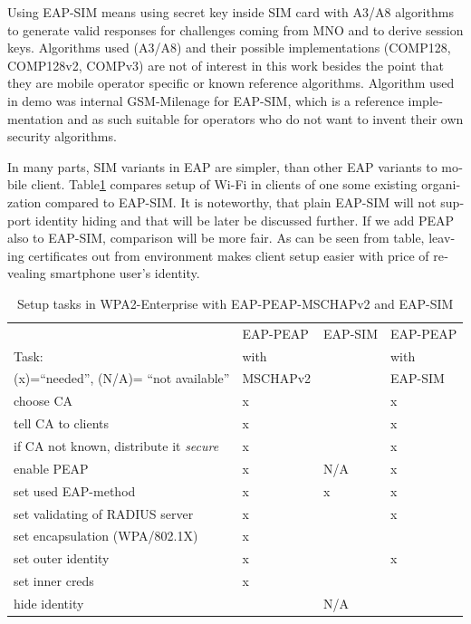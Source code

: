 \documentclass[12pt,a4paper,english]{tutthesis}
\begin{document}
\begin{otherlanguage}{english}
  Using EAP-SIM means using secret key inside SIM card with A3/A8
algorithms to generate valid responses for challenges coming from MNO
and to derive session keys.  Algorithms used (A3/A8) and their
possible implementations (COMP128, COMP128v2, COMPv3) are not of
interest in this work besides the point that they are mobile operator
specific or known reference algorithms.
Algorithm used in demo was internal GSM-Milenage for EAP-SIM,
which is a reference implementation and as such suitable for  operators who do not 
want to invent their own security algorithms. 


In many parts, SIM variants in EAP are simpler, than other EAP
variants to mobile client.  Table\ref{table-peapsim} compares setup of Wi-Fi
in clients of one some existing organization compared to EAP-SIM. It
is noteworthy, that plain EAP-SIM will not support identity hiding and
that will be later be discussed further. If we add PEAP \cite{peap}
also to EAP-SIM, comparison will be more fair.
As can be seen from table, leaving certificates out from environment
makes client setup easier with price of revealing smartphone user's
identity.  



\begin{table}[htb]
\caption{\label{table-peapsim}Setup tasks in  WPA2-Enterprise with EAP-PEAP-MSCHAPv2 and EAP-SIM}
\centering
\begin{tabular}{llll}
 & EAP-PEAP & EAP-SIM & EAP-PEAP\\
Task: & with &  & with\\
(x)=``needed'', (N/A)= ``not available'' & MSCHAPv2 &  & EAP-SIM\\
\hline
choose CA & x &  & x\\
tell CA to clients & x &  & x\\
if CA not known, distribute it \emph{secure} & x &  & x\\
enable PEAP & x & N/A & x\\
set used EAP-method & x & x & x\\
set validating of RADIUS server & x &  & x\\
set encapsulation (WPA/802.1X) & x &  & \\
set outer identity & x &  & x\\
set inner creds & x &  & \\
hide identity &  & N/A & \\
\hline
\end{tabular}
\end{table}






\end{otherlanguage}
\end{document}
